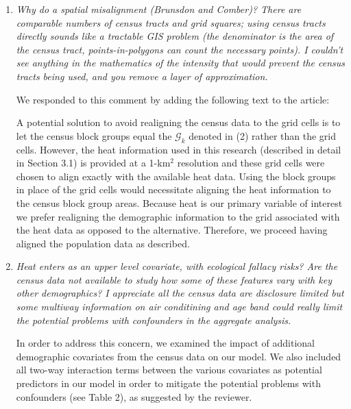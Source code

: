 \documentclass{article}
\begin{document}
\begin{enumerate}

\item\textit{Why do a spatial misalignment (Brunsdon and Comber)?   There are comparable numbers of census tracts and grid squares; using census tracts directly sounds like a tractable GIS problem (the denominator is the area of the census tract, points-in-polygons can count the necessary points).   I couldn't see anything in the mathematics of the intensity that would prevent the census tracts being used, and you remove a layer of approximation.}

We responded to this comment by adding the following text to the article:

\begin{displayquote}
A potential solution to avoid realigning the census data to the grid cells is to let the census block groups equal the $\mathcal{G}_k$ denoted in (2) rather than the grid cells. However, the heat information used in this research (described in detail in Section 3.1) is provided at a 1-km$^2$ resolution and these grid cells were chosen to align exactly with the available heat data. Using the block groups in place of the grid cells would necessitate aligning the heat information to the census block group areas. Because heat is our primary variable of interest we prefer realigning the demographic information to the grid associated with the heat data as opposed to the alternative. Therefore, we proceed having aligned the population data as described.
\end{displayquote}

\item\textit{Heat enters as an upper level covariate, with ecological fallacy risks?   Are the census data not available to study how some of these features vary with key other demographics?   I appreciate all the census data are disclosure limited but some multiway information on air conditining and age band could really limit the potential problems with confounders in the aggregate analysis.}

In order to address this concern, we examined the impact of additional demographic covariates from the census data on our model. We also included all two-way interaction terms between the various covariates as potential predictors in our model in order to mitigate the potential problems with confounders (see Table 2), as suggested by the reviewer. 


\end{enumerate}
\end{document}
